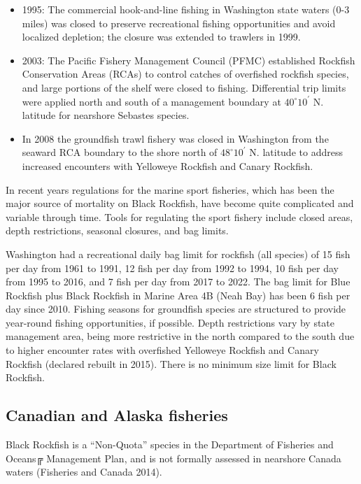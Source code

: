 \documentclass[11pt,
  english,
  letterpaper,
]{article}
\providecommand{\tightlist}{%
  \setlength{\itemsep}{0pt}\setlength{\parskip}{0pt}}
\providecommand{\tightlist}{%
  \setlength{\itemsep}{0pt}\setlength{\parskip}{0pt}}
\begin{document}
\begin{itemize}
\tightlist
\item
  1995: The commercial hook-and-line fishing in Washington state waters (0-3 miles) was closed to preserve recreational fishing opportunities and avoid localized depletion; the closure was extended to trawlers in 1999.\\
\item
  2003: The Pacific Fishery Management Council (PFMC) established Rockfish Conservation Areas (RCAs) to control catches of overfished rockfish species, and large portions of the shelf were closed to fishing. Differential trip limits were applied north and south of a management boundary at \(40^\circ 10^\prime\) N. latitude for nearshore Sebastes species.
\item
  In 2008 the groundfish trawl fishery was closed in Washington from the seaward RCA boundary to the shore north of \(48^\circ 10^\prime\) N. latitude to address increased encounters with Yelloweye Rockfish and Canary Rockfish.
\end{itemize}

In recent years regulations for the marine sport fisheries, which has been the major source of mortality on Black Rockfish, have become quite complicated and variable through time. Tools for regulating the sport fishery include closed areas, depth restrictions, seasonal closures, and bag limits.

Washington had a recreational daily bag limit for rockfish (all species) of 15 fish per day from 1961 to 1991, 12 fish per day from 1992 to 1994, 10 fish per day from 1995 to 2016, and 7 fish per day from 2017 to 2022. The bag limit for Blue Rockfish plus Black Rockfish in Marine Area 4B (Neah Bay) has been 6 fish per day since 2010. Fishing seasons for groundfish species are structured to provide year-round fishing opportunities, if possible. Depth restrictions vary by state management area, being more restrictive in the north compared to the south due to higher encounter rates with overfished Yelloweye Rockfish and Canary Rockfish (declared rebuilt in 2015). There is no minimum size limit for Black Rockfish.

\hypertarget{canadian-and-alaska-fisheries}{%
\subsection{Canadian and Alaska fisheries}\label{canadian-and-alaska-fisheries}}

Black Rockfish is a ``Non-Quota'' species in the Department of Fisheries and Oceans╔ Management Plan, and is not formally assessed in nearshore Canada waters (Fisheries and Canada 2014).
\end{document}
